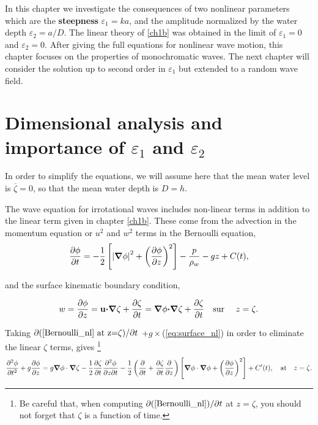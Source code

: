 In this chapter we investigate the consequences of two nonlinear parameters which are the   \textbf{steepness} $\varepsilon_1= k a$, and the amplitude normalized by the water depth $\varepsilon_2= a/D$. 
The linear theory of \ref{ch1b} was obtained in the limit of $\varepsilon_1=0$ and $\varepsilon_2=0$. After giving the full equations for nonlinear wave motion, this chapter focuses on the properties 
of monochromatic waves. The next chapter will consider the solution up to second order in $\varepsilon_1$ but extended to a random wave field. 



\section{Dimensional analysis and importance of $\varepsilon_1$ and $\varepsilon_2$ }
In order to simplify the equations, we will assume here that the mean water level is  $\overline{\zeta}=0$, so that the mean water depth is  $D=h$. 

The wave equation for irrotational waves includes non-linear terms in addition to the linear term given in chapter \ref{ch1b}. These come from the 
advection in the momentum equation or $u^2$ and $w^2$ terms in the Bernoulli equation,  
\begin{equation}
    \frac{\partial \phi}{\partial t}=
    -\frac{1}{2}\left[
    \left|\mbox{\boldmath $\nabla$} \phi\right|^2
    +\left(\frac{\partial \phi}{\partial z}\right)^2
    \right]
    -\frac{p}{\rho_w}-g z + C(t),\label{Bernoulli_nl}
\end{equation}

and the surface kinematic boundary condition, 

\begin{equation}
    w=\frac{\partial \phi }{\partial z}= {\mathbf u}\mbox{\boldmath $\cdot$} \mbox{\boldmath $\nabla$} \zeta + \frac{\partial \zeta }{\partial t}= \mbox{\boldmath $\nabla$} {\mathbf \phi}\mbox{\boldmath $\cdot$}\mbox{\boldmath $\nabla$} \zeta
    + \frac{\partial \zeta }{\partial t}
    \quad \mbox{sur\ }\quad z=\zeta.  \label{eq:surface_nl}
\end{equation}

Taking $\partial (\ref{Bernoulli_nl} \textrm{~at~z=}\zeta)/\partial t $
+$g\times$(\ref{eq:surface_nl}) in order to eliminate the linear $\zeta$ terms, gives \footnote{Be careful that, when computing 
$\partial (\ref{Bernoulli_nl})/\partial t$ at $z=\zeta$, you should not forget that  $\zeta$ is a function of time.}
\begin{equation}
  \frac{\partial^2{\phi}}{\partial{t^2}}+g\frac{\partial\phi}{\partial z}=
g\mbox{\boldmath $\nabla$}\phi \cdot \mbox{\boldmath $\nabla$}\zeta - \frac{1}{2}\frac{\partial \zeta}{\partial
t}\frac{\partial^2 \phi}{\partial z \partial t}-  \frac{1}{2} \left(\frac{\partial }{\partial t}+\frac{\partial
\zeta}{\partial t}\frac{\partial }{\partial z}\right) \left[\mbox{\boldmath $\nabla$}\phi \cdot
{\mbox{\boldmath $\nabla$}\phi} + \left(\frac{\partial\phi}{\partial
z}\right)^2\right]+C'(t), \quad \mbox{at}
\quad  z=\zeta. \label{surface comb}
\end{equation}

